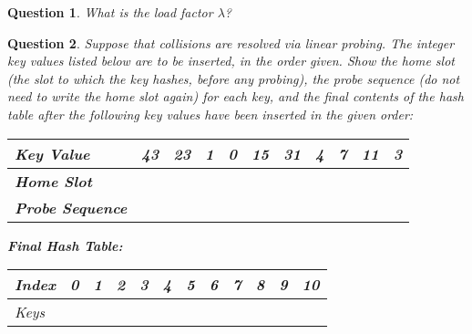 \documentclass[10.5pt]{article}
\newtheorem{Q}{Question}
\begin{document}
\begin{Q}
What is the load factor $\lambda$?
\vspace{3cm}
\end{Q}

\begin{Q}
Suppose that collisions are resolved via linear probing. The integer key values listed below are to
be inserted, in the order given. Show the home slot (the slot to which the key hashes, before any probing), the
probe sequence (do not need to write the home slot again) for each key, and the final contents of the hash table after the following key values have been inserted in the given order:
\begin{table}[ht]
\begin{tabular}{|p{1.7cm}|p{1cm}|p{1cm}|p{1cm}|p{1cm}|p{1cm}|p{1cm}|p{1cm}|p{1cm}|p{1cm}|p{1cm}|}
\hline
\textbf{Key Value}& 43&23&1&0&15&31&4&7&11&3 \\ \hline
\textbf{Home Slot}& &&&&&&&&&     \\ \hline
\textbf{Probe Sequence}& &&&&&&&&&     \\ \hline
\end{tabular}
\end{table}
\pagebreak

\textbf{Final Hash Table:}
\begin{table}[ht]
\begin{tabular}{|l|p{1cm}|p{1cm}|p{1cm}|p{1cm}|p{1cm}|p{1cm}|p{1cm}|p{1cm}|p{1cm}|p{1cm}|p{1cm}|}
\hline
Index & 0&1&2&3&4&5&6&7&8&9&10 \\ \hline
Keys     &&&&&&&&&&&\\ \hline
\end{tabular}
\end{table}
\end{Q}
\end{document}
